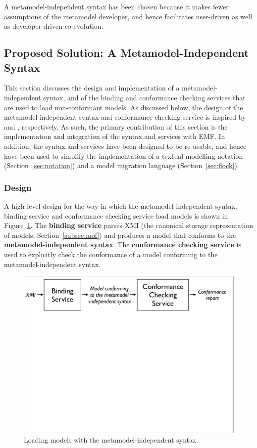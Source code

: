 A metamodel-independent syntax has been chosen because it makes fewer assumptions of the metamodel developer, and hence facilitates user-driven as well as developer-driven co-evolution.


\subsection{Proposed Solution: A Metamodel-Independent Syntax}
\label{subsec:binding}
This section discusses the design and implementation of a metamodel-independent syntax, and of the binding and conformance checking services that are used to load non-conformant models. As discussed below, the design of the metamodel-independent syntax and conformance checking service is inspired by \cite{uml212} and \cite{paige07metamodel}, respectively. As such, the primary contribution of this section is the implementation and integration of the syntax and services with EMF. In addition, the syntax and services have been designed to be re-usable, and hence have been used to simplify the implementation of a textual modelling notation (Section~\ref{sec:notation}) and a model migration language (Section~\ref{sec:flock}).

\subsubsection{Design}
A high-level design for the way in which the metamodel-independent syntax, binding service and conformance checking service load models is shown in Figure~\ref{fig:mmi_workflow}. The \textbf{binding service} parses XMI (the canonical storage representation of models, Section~\ref{subsec:mof}) and produces a model that conforms to the \textbf{metamodel-independent syntax}. The \textbf{conformance checking service} is used to explicitly check the conformance of a model conforming to the metamodel-independent syntax.

\begin{figure}[htbp]
	\centering
		\includegraphics*[viewport=10 590 990 760,width=11.5cm]{5.Implementation/images/mmi_workflow.pdf}
	\caption{Loading models with the metamodel-independent syntax}
	\label{fig:mmi_workflow}
\end{figure}

